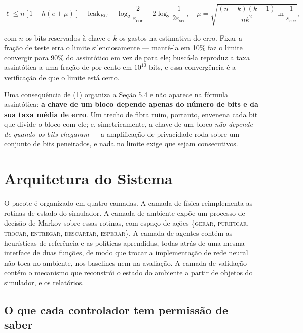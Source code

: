 \documentclass[12pt]{article}
\begin{document}
\begin{equation}
\ell \le n\left[1 - h(e + \mu)\right] - \mathrm{leak}_{EC}
        - \log_2\frac{2}{\varepsilon_{\mathrm{cor}}}
        - 2\log_2\frac{1}{2\varepsilon_{\mathrm{sec}}},
\quad
\mu = \sqrt{\frac{(n+k)(k+1)}{n k^2}\ln\frac{1}{\varepsilon_{\mathrm{sec}}}},
\end{equation}

com $n$ os bits reservados à chave e $k$ os gastos na estimativa do erro. Fixar
a fração de teste erra o limite silenciosamente --- mantê-la em 10\% faz o
limite convergir para 90\% do assintótico em vez de para ele; buscá-la
reproduz a taxa assintótica a uma fração de por cento em $10^{10}$ bits, e essa
convergência é a verificação de que o limite está certo.

Uma consequência de (1) organiza a Seção 5.4 e não aparece na fórmula
assintótica: \textbf{a chave de um bloco depende apenas do número de bits e da
sua taxa média de erro}. Um trecho de fibra ruim, portanto, envenena cada bit
que divide o bloco com ele; e, simetricamente, a chave de um bloco \emph{não
depende de quando os bits chegaram} --- a amplificação de privacidade roda sobre
um conjunto de bits peneirados, e nada no limite exige que sejam consecutivos.

\section{Arquitetura do Sistema}

O pacote é organizado em quatro camadas. A camada de física reimplementa as
rotinas de estado do simulador. A camada de ambiente expõe um processo de
decisão de Markov sobre essas rotinas, com espaço de ações
\{\textsc{gerar}, \textsc{purificar}, \textsc{trocar}, \textsc{entregar},
\textsc{descartar}, \textsc{esperar}\}. A camada de agentes contém as
heurísticas de referência e as políticas aprendidas, todas atrás de uma mesma
interface de duas funções, de modo que trocar a implementação de rede neural
não toca no ambiente, nos baselines nem na avaliação. A camada de validação
contém o mecanismo que reconstrói o estado do ambiente a partir de objetos do
simulador, e os relatórios.

\subsection{O que cada controlador tem permissão de saber}
\end{document}
